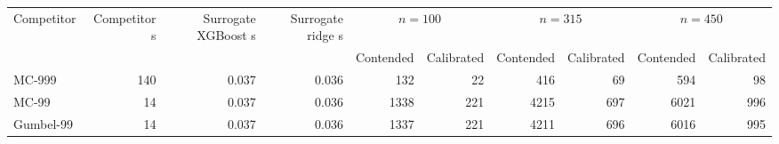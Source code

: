\begin{tabular}{lrrrrrrrrr}
\toprule
Competitor & Competitor s & Surrogate XGBoost s & Surrogate ridge s & \multicolumn{2}{c}{$n = 100$} & \multicolumn{2}{c}{$n = 315$} & \multicolumn{2}{c}{$n = 450$} \\
\cmidrule(lr){5-6} \cmidrule(lr){7-8} \cmidrule(lr){9-10}
 & & & & Contended & Calibrated & Contended & Calibrated & Contended & Calibrated \\
\midrule
MC-999 & 140 & 0.037 & 0.036 & 132 & 22 & 416 & 69 & 594 & 98 \\
MC-99 & 14 & 0.037 & 0.036 & 1338 & 221 & 4215 & 697 & 6021 & 996 \\
Gumbel-99 & 14 & 0.037 & 0.036 & 1337 & 221 & 4211 & 696 & 6016 & 995 \\
\bottomrule
\end{tabular}
